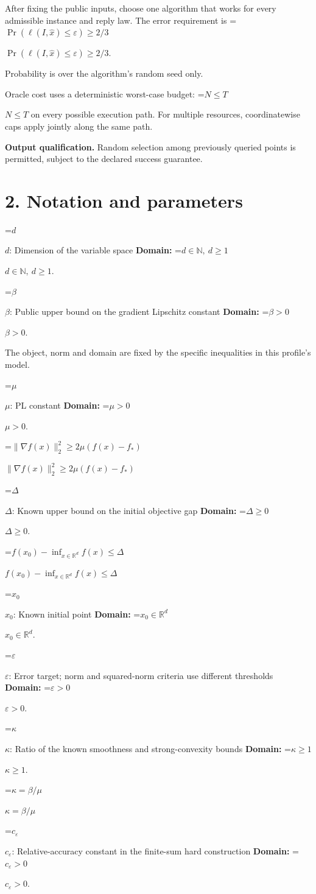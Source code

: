 \documentclass[10pt,a4paper]{article}
\newcommand{\AtlasMath}[1]{\par\begingroup\centering\setbox0=\hbox{$\displaystyle #1$}\ifdim\wd0>1.4\linewidth\typeout{ATLAS WIDE FORMULA: \the\wd0}\fi\ifdim\wd0>\linewidth\resizebox{\linewidth}{!}{\box0}\else\box0\fi\par\endgroup}
\newcommand{\AtlasInlineMath}[1]{\begingroup\setbox0=\hbox{$#1$}\ifdim\wd0>.4\linewidth\endgroup\AtlasMath{#1}\else\endgroup$#1$\fi}
\begin{document}
After fixing the public inputs, choose one algorithm that works for every admissible instance and reply law. The error requirement is \AtlasInlineMath{\Pr(\ell(I,\widehat{x})\le \varepsilon)\ge2/3}.

Probability is over the algorithm's random seed only.

Oracle cost uses a deterministic worst-case budget: \AtlasInlineMath{N\le T} on every possible execution path. For multiple resources, coordinatewise caps apply jointly along the same path.

\textbf{Output qualification.} Random selection among previously queried points is permitted, subject to the declared success guarantee.

\section{2. Notation and parameters}
\AtlasInlineMath{d}: Dimension of the variable space \textbf{Domain:} \AtlasInlineMath{d\in\mathbb{N},\ d\ge1}.

\AtlasInlineMath{\beta}: Public upper bound on the gradient Lipschitz constant \textbf{Domain:} \AtlasInlineMath{\beta>0}.

The object, norm and domain are fixed by the specific inequalities in this profile's model.

\AtlasInlineMath{\mu}: PL constant \textbf{Domain:} \AtlasInlineMath{\mu>0}.

\AtlasInlineMath{\|\nabla f(x)\|_2^2\ge2\mu(f(x)-f_*)}

\AtlasInlineMath{\Delta}: Known upper bound on the initial objective gap \textbf{Domain:} \AtlasInlineMath{\Delta\ge0}.

\AtlasInlineMath{f(x_0)-\inf_{x\in\mathbb{R}^d}f(x)\le\Delta}

\AtlasInlineMath{x_0}: Known initial point \textbf{Domain:} \AtlasInlineMath{x_0\in\mathbb{R}^d}.

\AtlasInlineMath{\varepsilon}: Error target; norm and squared-norm criteria use different thresholds \textbf{Domain:} \AtlasInlineMath{\varepsilon>0}.

\AtlasInlineMath{\kappa}: Ratio of the known smoothness and strong-convexity bounds \textbf{Domain:} \AtlasInlineMath{\kappa\ge1}.

\AtlasInlineMath{\kappa=\beta/\mu}

\AtlasInlineMath{c_\varepsilon}: Relative-accuracy constant in the finite-sum hard construction \textbf{Domain:} \AtlasInlineMath{c_\varepsilon>0}.
\end{document}
